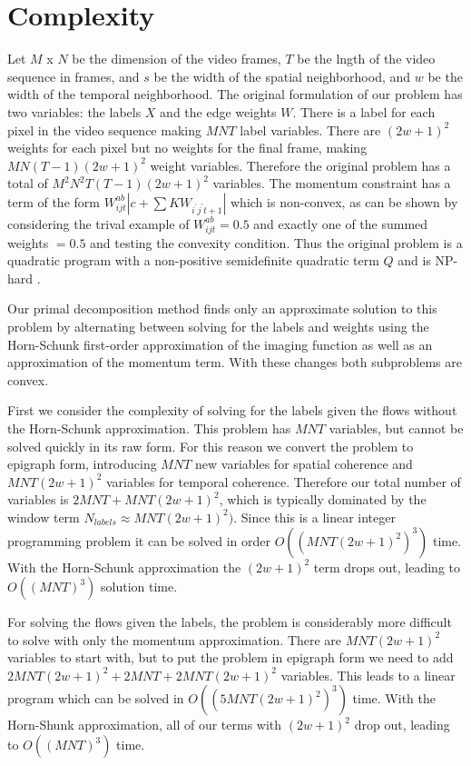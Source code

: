 \section{Complexity}

Let $M$ x $N$ be the dimension of the video frames, $T$ be the lngth of the video sequence in frames, and $s$ be the width of the spatial neighborhood, and $w$ be the width of the temporal neighborhood. The original formulation of our problem has two variables: the labels $X$ and the edge weights $W$. There is a label for each pixel in the video sequence making $M N T$ label variables. There are $(2 w+1)^2$ weights for each pixel but no weights for the final frame, making $M N (T-1) (2 w + 1)^2$ weight variables. Therefore the original problem has a total of $M^2 N^2 T (T-1) (2 w + 1)^2$ variables. The momentum constraint has a term of the form $W_{ijt}^{ab} |c + \sum K W_{i^{'} j^{'} t+1} |$ which is non-convex, as can be shown by considering the trival example of $W_{ijt}^{ab} = 0.5$ and exactly one of the summed weights $= 0.5$ and testing the convexity condition. Thus the original problem is a quadratic program with a non-positive semidefinite quadratic term $Q$ and is NP-hard \cite{sahni1974computationally}.

Our primal decomposition method finds only an approximate solution to this problem by alternating between solving for the labels and weights using the Horn-Schunk first-order approximation of the imaging function as well as an approximation of the momentum term. With these changes both subproblems are convex.

First we consider the complexity of solving for the labels given the flows without the Horn-Schunk approximation. This problem has $M N T$ variables, but cannot be solved quickly in its raw form. For this reason we convert the problem to epigraph form, introducing $M N T$ new variables for spatial coherence and $M N T (2 w + 1)^2$ variables for temporal coherence. Therefore our total number of variables is $2 M N T + M N T (2 w + 1)^2$, which is typically dominated by the window term $N_{labels} \approx M N T (2 w + 1)^2)$. Since this is a linear integer programming problem it can be solved in order $O((M N T (2 w + 1)^2)^3)$ time. With the Horn-Schunk approximation the $(2 w + 1)^2$ term drops out, leading to $O((M N T)^3)$ solution time.

For solving the flows given the labels, the problem is considerably more difficult to solve with only the momentum approximation. There are $M N T (2 w + 1)^2$ variables to start with, but to put the problem in epigraph form we need to add $2 M N T (2 w + 1)^2 + 2 M N T + 2 M N T (2 w + 1)^2$ variables. This leads to a linear program which can be solved in 
$O((5 M N T (2 w + 1)^2)^3)$ time. With the Horn-Shunk approximation, all of our terms with $(2 w + 1)^2$ drop out, leading to $O((M N T)^3)$ time.

